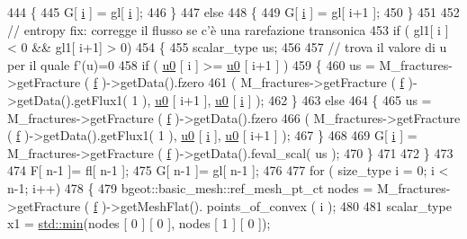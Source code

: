 \begin{DoxyCode}
444         \{
445             G[ \hyperlink{god__e_8m_a8604be5925f4266ab5ccc69675329c80}{i} ] = gl[ \hyperlink{god__e_8m_a8604be5925f4266ab5ccc69675329c80}{i} ];
446         \}
447         \textcolor{keywordflow}{else}
448         \{
449             G[ \hyperlink{god__e_8m_a8604be5925f4266ab5ccc69675329c80}{i} ] = gl[ i+1 ];
450         \}
451 
452         \textcolor{comment}{// entropy fix: corregge il flusso se c'è una rarefazione transonica}
453         \textcolor{keywordflow}{if} ( gl1[ i ] < 0 && gl1[ i+1] > 0)
454         \{
455             scalar\_type us;
456 
457             \textcolor{comment}{// trova il valore di u per il quale f'(u)=0}
458             \textcolor{keywordflow}{if} ( \hyperlink{god__e_8m_ae060ce5868d35ef17bcb6e832da03be9}{u0} [ i ] >= \hyperlink{god__e_8m_ae060ce5868d35ef17bcb6e832da03be9}{u0} [ i+1 ] )
459             \{
460                 us = M\_fractures->getFracture ( \hyperlink{god__e_8m_a68f477f9b30a6300d5af9b02eac82f35}{f} )->getData().fzero
461                                                     ( M\_fractures->getFracture ( 
      \hyperlink{god__e_8m_a68f477f9b30a6300d5af9b02eac82f35}{f} )->getData().getFlux1( 1 ), \hyperlink{god__e_8m_ae060ce5868d35ef17bcb6e832da03be9}{u0} [ i+1 ], \hyperlink{god__e_8m_ae060ce5868d35ef17bcb6e832da03be9}{u0} [ \hyperlink{god__e_8m_a8604be5925f4266ab5ccc69675329c80}{i} ] );
462             \}
463             \textcolor{keywordflow}{else}
464             \{
465                 us = M\_fractures->getFracture ( \hyperlink{god__e_8m_a68f477f9b30a6300d5af9b02eac82f35}{f} )->getData().fzero
466                                                     ( M\_fractures->getFracture ( 
      \hyperlink{god__e_8m_a68f477f9b30a6300d5af9b02eac82f35}{f} )->getData().getFlux1( 1 ), \hyperlink{god__e_8m_ae060ce5868d35ef17bcb6e832da03be9}{u0} [ \hyperlink{god__e_8m_a8604be5925f4266ab5ccc69675329c80}{i} ], \hyperlink{god__e_8m_ae060ce5868d35ef17bcb6e832da03be9}{u0} [ i+1 ] );
467             \}
468 
469             G[ \hyperlink{god__e_8m_a8604be5925f4266ab5ccc69675329c80}{i} ] = M\_fractures->getFracture ( \hyperlink{god__e_8m_a68f477f9b30a6300d5af9b02eac82f35}{f} )->getData().feval\_scal( us );
470         \}
471 
472     \}
473 
474     F[ n-1 ]= fl[ n-1 ];
475     G[ n-1 ]= gl[ n-1 ];
476 
477     \textcolor{keywordflow}{for} ( size\_type i = 0; i < n-1; i++)
478     \{
479         bgeot::basic\_mesh::ref\_mesh\_pt\_ct nodes = M\_fractures->getFracture ( \hyperlink{god__e_8m_a68f477f9b30a6300d5af9b02eac82f35}{f} )->getMeshFlat().
      points\_of\_convex ( i );
480 
481         scalar\_type x1 = \hyperlink{UsefulFunctions_8h_a9700932e89ccb7eeacaee21db125b0c4}{std::min}(nodes [ 0 ] [ 0 ], nodes [ 1 ] [ 0 ]);

\end{DoxyCode}
